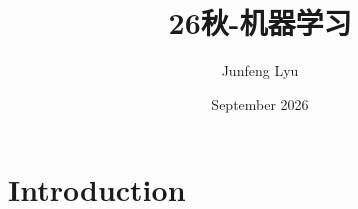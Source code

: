 \documentclass{article}
\title{26秋-机器学习}
\author{Junfeng Lyu}
\date{September 2026}
\begin{document}
\maketitle

\section{Introduction}
\end{document}

